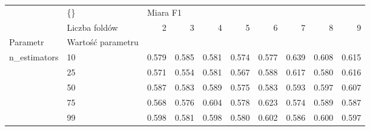 \begin{tabular}{llrrrrrrrr}
\hline
             & \{\} & \multicolumn{8}{l}{Miara F1} \\
             & Liczba foldów &        2 &      3 &      4 &      5 &      6 &      7 &      8 &      9 \\
Parametr & Wartość parametru &          &        &        &        &        &        &        &        \\
\hline
n\_estimators & 10 &    0.579 &  0.585 &  0.581 &  0.574 &  0.577 &  0.639 &  0.608 &  0.615 \\
             & 25 &    0.571 &  0.554 &  0.581 &  0.567 &  0.588 &  0.617 &  0.580 &  0.616 \\
             & 50 &    0.587 &  0.583 &  0.589 &  0.575 &  0.583 &  0.593 &  0.597 &  0.607 \\
             & 75 &    0.568 &  0.576 &  0.604 &  0.578 &  0.623 &  0.574 &  0.589 &  0.587 \\
             & 99 &    0.598 &  0.581 &  0.598 &  0.580 &  0.602 &  0.586 &  0.600 &  0.597 \\
\hline
\end{tabular}
